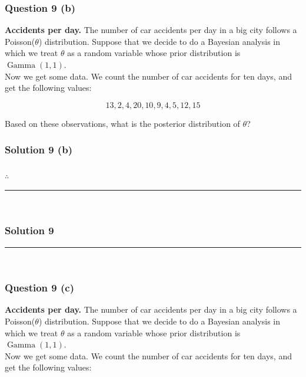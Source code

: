 \documentclass{article}
\begin{document}
\subsubsection*{Question 9 (b)}
\begin{flushleft}
\textbf{Accidents per day.} The number of car accidents per day in a big city follows a Poisson($\theta$) distribution. Suppose that we decide to do a Bayesian analysis in which we treat $\theta$ as a random variable whose prior distribution is $\operatorname{Gamma}(1,1)$.\\
Now we get some data. We count the number of car accidents for ten days, and get the following values:
\end{flushleft}

$$13, 2, 4, 20, 10, 9, 4, 5, 12, 15$$
\begin{flushleft}
Based on these observations, what is the posterior distribution of $\theta$?
\end{flushleft}

\subsubsection*{Solution 9 (b)}

\subsubsection*{\normalfont}{$\therefore$ } \\

\noindent\rule{\textwidth}{0.4pt}\\

\newpage

\subsubsection*{Solution 9}
\noindent\rule{\textwidth}{0.4pt}\\
\subsubsection*{Question 9 (c)}
\begin{flushleft}
\textbf{Accidents per day.} The number of car accidents per day in a big city follows a Poisson($\theta$) distribution. Suppose that we decide to do a Bayesian analysis in which we treat $\theta$ as a random variable whose prior distribution is $\operatorname{Gamma}(1,1)$.\\
Now we get some data. We count the number of car accidents for ten days, and get the following values:
\end{flushleft}
\end{document}
